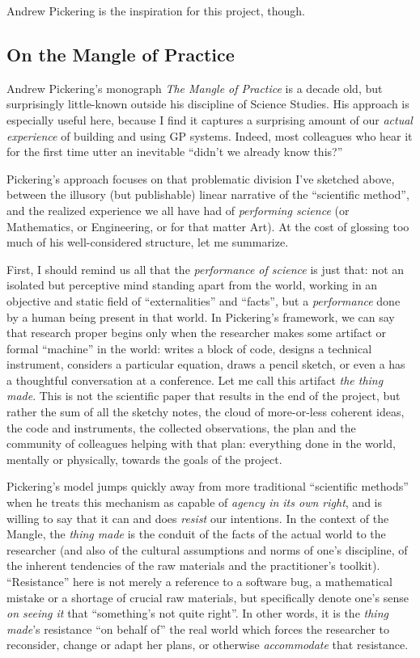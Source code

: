 Andrew Pickering is the inspiration for this project, though.

\subsection{On the Mangle of Practice}\hypertarget{on-the-mangle-of-practice}{}\label{on-the-mangle-of-practice}

Andrew Pickering's monograph \emph{The Mangle of Practice} is a decade old, but surprisingly little-known outside his discipline of Science Studies. His approach is especially useful here, because I find it captures a surprising amount of our \emph{actual experience} of building and using GP systems. Indeed, most colleagues who hear it for the first time utter an inevitable ``didn't we already know this?''

Pickering's approach focuses on that problematic division I've sketched above, between the illusory (but publishable) linear narrative of the ``scientific method'', and the realized experience we all have had of \emph{performing science} (or Mathematics, or Engineering, or for that matter Art). At the cost of glossing too much of his well-considered structure, let me summarize.

First, I should remind us all that the \emph{performance of science} is just that: not an isolated but perceptive mind standing apart from the world, working in an objective and static field of ``externalities'' and ``facts'', but a \emph{performance} done by a human being present in that world. In Pickering's  framework, we can say that research proper begins only when the researcher makes some artifact or formal ``machine'' in the world: writes a block of code, designs a technical instrument, considers a particular equation, draws a pencil sketch, or even a has a thoughtful conversation at a conference. Let me call this artifact \emph{the thing made}. This is not the scientific paper that results in the end of the project, but rather the sum of all the sketchy notes, the cloud of more-or-less coherent ideas, the code and instruments, the collected observations, the plan and the community of colleagues helping with that plan: everything done in the world, mentally or physically, towards the goals of the project.

Pickering's model jumps quickly away from more traditional ``scientific methods'' when he treats this mechanism as capable of \emph{agency in its own right}, and is willing to say that it can and does \emph{resist} our intentions. In the context of the Mangle, the \emph{thing made} is the conduit of the facts of the actual world to the researcher (and also of the cultural assumptions and norms of one's discipline, of the inherent tendencies of the raw materials and the practitioner's toolkit). ``Resistance'' here is not merely a reference to a software bug, a mathematical mistake or a shortage of crucial raw materials, but specifically denote one's sense \emph{on seeing it} that ``something's not quite right''. In other words, it is the \emph{thing made}'s resistance ``on behalf of'' the real world which forces the researcher to reconsider, change or adapt her plans, or otherwise \emph{accommodate} that resistance.

